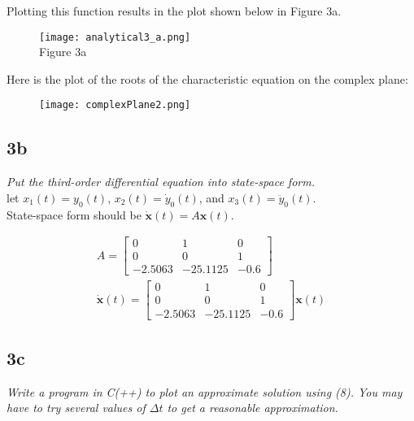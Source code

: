 \documentclass[10pt, AMS Euler]{article}
\begin{document}
Plotting this function results in the plot shown below in Figure 3a.
\begin{figure}[H]
    \centering
    \texttt{[image: analytical3\_a.png]}\\
    Figure 3a
\end{figure}

Here is the plot of the roots of the characteristic equation on the complex plane:

\begin{figure}[H]
    \centering
    \texttt{[image: complexPlane2.png]}
\end{figure}

\subsection*{3b}
\textit{Put the third-order differential equation into state-space form.
}\\

let $x_1(t) = y_0(t)$, $x_2(t) = \dot{y}_0(t)$, and $x_3(t) = \ddot{y}_0(t)$.\\

State-space form should be $\dot{\boldsymbol{x}}(t) = A\boldsymbol{x}(t)$.

\begin{center}
    \begin{align*}
        A = \begin{bmatrix}
        0 & 1 & 0\\
        0 & 0 & 1\\
        -2.5063 & -25.1125 & -0.6
        \end{bmatrix}\\
        \dot{\boldsymbol{x}}(t) = 
        \begin{bmatrix}
        0 & 1 & 0\\
        0 & 0 & 1\\
        -2.5063 & -25.1125 & -0.6
        \end{bmatrix}
        \boldsymbol{x}(t)
    \end{align*}
\end{center}

\subsection*{3c}
\textit{Write a program in C(++) to plot an approximate solution using (8). You may have to try several
values of $\Delta t$ to get a reasonable approximation.}\\
\end{document}
